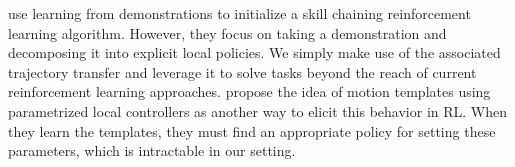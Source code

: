 \citet{konidaris2010constructing} use learning from demonstrations to initialize a skill chaining reinforcement learning algorithm.
However, they focus on taking a demonstration and decomposing it into explicit local policies.
We simply make use of the associated trajectory transfer and leverage it to solve tasks beyond the reach of current reinforcement learning approaches.
\citet{Neumann09learningcomplex} propose the idea of motion templates using parametrized local controllers as another way to elicit this behavior in RL.
When they learn the templates, they must find an appropriate policy for setting these parameters, which is intractable in our setting.
